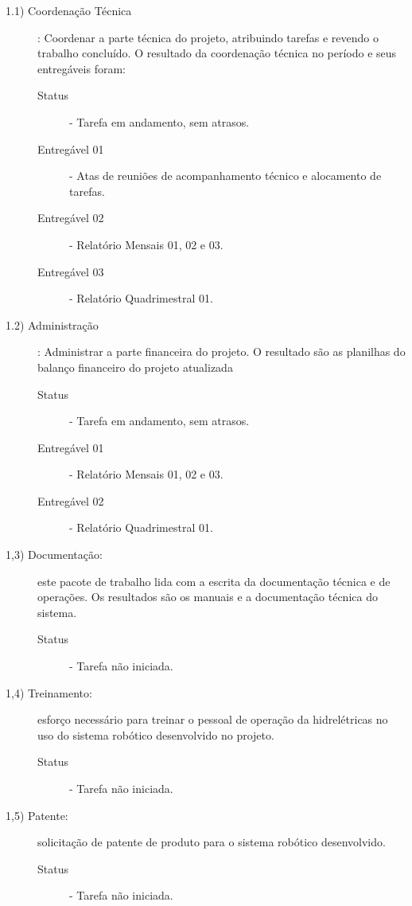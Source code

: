 \begin{description}

\item[1.1) Coordenação Técnica]: Coordenar a parte técnica do projeto, atribuindo tarefas e revendo o trabalho concluído. O resultado da coordenação técnica no período e seus entregáveis foram: 

\begin{description}
	\item [Status] - Tarefa em andamento, sem atrasos. 
	\item [Entregável 01] - Atas de reuniões de acompanhamento técnico e alocamento de tarefas.  
	\item [Entregável 02] - Relatório Mensais 01, 02 e 03. 
	\item [Entregável 03] - Relatório Quadrimestral 01. 
\end{description} 


\item[1.2) Administração]:  Administrar a parte financeira do projeto. O resultado são as planilhas do balanço financeiro do projeto atualizada 

\begin{description}
	\item [Status] - Tarefa em andamento, sem atrasos.  
	\item [Entregável 01] - Relatório Mensais 01, 02 e 03. 
	\item [Entregável 02] - Relatório Quadrimestral 01. 
\end{description} 


	\item[1,3) Documentação:] este pacote de trabalho lida com a escrita da documentação técnica e de operações. Os resultados são os manuais e a documentação técnica do sistema.

\begin{description}
	\item [Status] - Tarefa não iniciada. 
\end{description} 

	\item[1,4) Treinamento:] esforço necessário para treinar o pessoal de operação da hidrelétricas no uso do  sistema robótico desenvolvido no projeto.

\begin{description}
	\item [Status] - Tarefa não iniciada. 
\end{description} 

	\item[1,5) Patente:] solicitação de patente de produto para o sistema robótico desenvolvido.

\begin{description}
	\item [Status] - Tarefa não iniciada. 
\end{description} 

\end{description}


